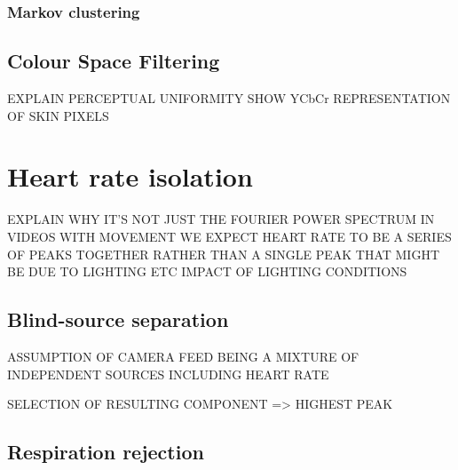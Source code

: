\subsubsection{Markov clustering}

\subsection{Colour Space Filtering}
EXPLAIN PERCEPTUAL UNIFORMITY 
SHOW YCbCr REPRESENTATION OF SKIN PIXELS


\section{Heart rate isolation}
EXPLAIN WHY IT'S NOT JUST THE FOURIER POWER SPECTRUM
IN VIDEOS WITH MOVEMENT WE EXPECT HEART RATE TO BE A SERIES OF PEAKS TOGETHER RATHER THAN A SINGLE PEAK
THAT MIGHT BE DUE TO LIGHTING ETC
IMPACT OF LIGHTING CONDITIONS

\subsection{Blind-source separation}
ASSUMPTION OF CAMERA FEED BEING A MIXTURE OF INDEPENDENT SOURCES INCLUDING HEART RATE

SELECTION OF RESULTING COMPONENT => HIGHEST PEAK



\subsection{Respiration rejection}
\subsection{}
